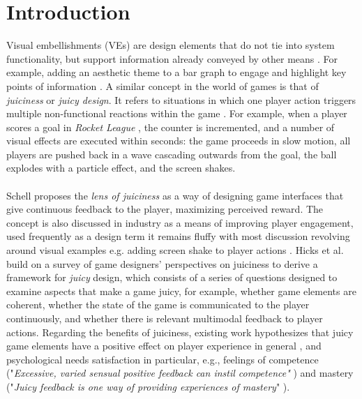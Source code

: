 \documentclass{sigchi}
\begin{document}
\section{Introduction}
Visual embellishments (VEs) are design elements that do not tie into system functionality, but support information already conveyed by other means \cite{bateman2010useful}. For example, adding an aesthetic theme to a bar graph to engage and highlight key points of information \cite{holmes1984designer}. A similar concept in the world of games is that of \textit{juiciness} or \textit{juicy design}. It refers to situations in which one player action triggers multiple non-functional reactions within the game \cite{juul2010casual}. For example, when a player scores a goal in \textit{Rocket League} \cite{rocketleague:pc}, the counter is incremented, and a number of visual effects are executed within seconds: the game proceeds in slow motion, all players are pushed back in a wave cascading outwards from the goal, the ball explodes with a particle effect, and the screen shakes. 
\\\\
Schell \cite{schell2014art} proposes the \textit{lens of juiciness} as a way of designing game interfaces that give continuous feedback to the player, maximizing perceived reward. The concept is also discussed in industry as a means of improving player engagement, used frequently as a design term it remains fluffy with most discussion revolving around visual examples e.g. adding screen shake to player actions \cite{jonasson2018juice}. Hicks et al. \cite{hicks2018juicy} build on a survey of game designers' perspectives on juiciness to derive a framework for \textit{juicy} design, which consists of a series of questions designed to examine aspects that make a game juicy, for example, whether game elements are coherent, whether the state of the game is communicated to the player continuously, and whether there is relevant multimodal feedback to player actions. Regarding the benefits of juiciness, existing work hypothesizes that juicy game elements have a positive effect on player experience in general \cite{swink2008game}, and psychological needs satisfaction in particular, e.g., feelings of competence ("\textit{Excessive, varied sensual positive feedback can instil competence"} \cite{deterding2015lens}) and mastery ("\textit{Juicy feedback is one way of providing experiences of mastery}" \cite{deterding_2018talk}).
\\\\
\end{document}
